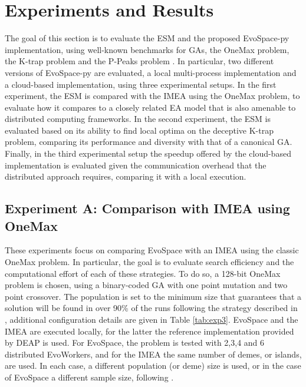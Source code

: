 \section{Experiments and Results}
\label{sec:exp1}
The goal of this section is to evaluate the ESM and the proposed EvoSpace-py implementation, using well-known benchmarks for GAs,
the OneMax problem, %
the K-trap problem \cite{trap} and the P-Peaks problem \cite{Jong:PS97}.
In particular, two different versions of EvoSpace-py are evaluated, a local multi-process implementation and a cloud-based implementation,
using three experimental setups.
In the first experiment, the ESM is compared with the IMEA using the OneMax problem, to evaluate how it compares to a closely related EA model that is also
amenable to distributed computing frameworks.
In the second experiment, the ESM is evaluated based on its ability to find local optima on the deceptive K-trap problem,
comparing its performance and diversity with that of a canonical GA.
Finally, in the third experimental setup the speedup offered by the cloud-based implementation is evaluated given the communication overhead
that the distributed approach requires, comparing it with a local execution.


\subsection{Experiment A: Comparison with IMEA using OneMax}
These experiments focus on comparing EvoSpace with an IMEA using the classic OneMax problem.
In particular, the goal is to evaluate search efficiency and the computational effort of each of these strategies.
To do so, a 128-bit OneMax problem is chosen, %
using a binary-coded GA with one point mutation and two point crossover.
The population is set to the minimum size that guarantees that
a solution will be found in over 90\% of the runs following the strategy described in \cite{nodeo},
additional configuration details are given in Table \ref{tab:exp3}.
EvoSpace and the IMEA are executed locally, for the latter the reference implementation provided by DEAP is used.
For EvoSpace, the problem is tested with 2,3,4 and 6 distributed EvoWorkers,
and for the IMEA the same number of demes, or islands, are used. In each case, a different population (or deme) size is used, or in 
the case of EvoSpace a different sample size, following \cite{nodeo}.

